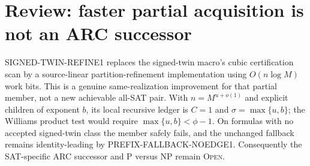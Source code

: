 \section{Review: faster partial acquisition is not an ARC successor}
SIGNED-TWIN-REFINE1 replaces the signed-twin macro's cubic certification scan
by a source-linear partition-refinement implementation using
$O(n\log M)$ work bits.  This is a genuine same-realization improvement for
that partial member, not a new achievable all-SAT pair.  With
$n=M^{u+o(1)}$ and explicit children of exponent $b$, its local recursive
ledger is $C=1$ and $\sigma=\max\{u,b\}$; the Williams product test would
require $\max\{u,b\}<\phi-1$.  On formulas with no accepted signed-twin class
the member safely fails, and the unchanged fallback remains identity-leading
by PREFIX-FALLBACK-NOEDGE1.  Consequently the SAT-specific ARC successor and
P versus NP remain \textsc{Open}.
